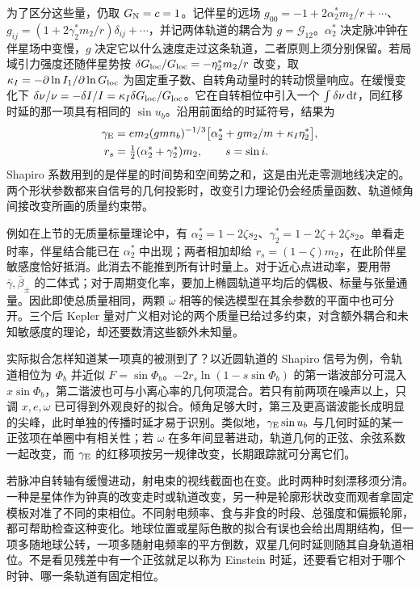 为了区分这些量，仍取 $G_{\rm N}=c=1$。记伴星的远场 $g_{00}=-1+2\alpha_2^*m_2/r+\cdots$、$g_{ij}=(1+2\gamma_2^*m_2/r)\delta_{ij}+\cdots$，并记两体轨道的耦合为 $g=\mathcal G_{12}$。$\alpha_2^*$ 决定脉冲钟在伴星场中变慢，$g$ 决定它以什么速度走过这条轨道，二者原则上须分别保留。若局域引力强度还随伴星势按 $\delta G_{\rm loc}/G_{\rm loc}=-\eta_2^*m_2/r$ 改变，取 $\kappa_I=-\partial\ln I_1/\partial\ln G_{\rm loc}$ 为固定重子数、自转角动量时的转动惯量响应。在缓慢变化下 $\delta\nu/\nu=-\delta I/I=\kappa_I\delta G_{\rm loc}/G_{\rm loc}$。它在自转相位中引入一个 $\int\delta\nu\,\dd t$，同红移时延的那一项具有相同的 $\sin u_b$。沿用前面给的时延符号，结果为
\begin{align*}
 \gamma_{\rm E}&=
  e m_2(gmn_b)^{-1/3}
       \big[\alpha_2^*+g m_2/m+\kappa_I\eta_2^*\big],\\
 r_s&=\tfrac12(\alpha_2^*+\gamma_2^*)m_2,\qquad
 s=\sin i .
\end{align*}
Shapiro 系数用到的是伴星的时间势和空间势之和，这是由光走零测地线决定的。两个形状参数都来自信号的几何投影时，改变引力理论仍会经质量函数、轨道倾角间接改变所画的质量约束带。

例如在上节的无质量标量理论中，有 $\alpha_2^*=1-2\zeta s_2$、$\gamma_2^*=1-2\zeta+2\zeta s_2$。单看走时率，伴星结合能已在 $\alpha_2^*$ 中出现；两者相加却给 $r_s=(1-\zeta)m_2$，在此阶伴星敏感度恰好抵消。此消去不能推到所有计时量上。对于近心点进动率，要用带 $\bar\gamma,\bar\beta_\pm$ 的二体式；对于周期变化率，要加上椭圆轨道平均后的偶极、标量与张量通量。因此即使总质量相同，两颗 $\dot\omega$ 相等的候选模型在其余参数的平面中也可分开。三个后 Kepler 量对广义相对论的两个质量已给过多约束，对含额外耦合和未知敏感度的理论，却还要数清这些额外未知量。

实际拟合怎样知道某一项真的被测到了？以近圆轨道的 Shapiro 信号为例，令轨道相位为 $\Phi_b$ 并近似 $F=\sin\Phi_b$。$-2r_s\ln(1-s\sin\Phi_b)$ 的第一谐波部分可混入 $x\sin\Phi_b$，第二谐波也可与小离心率的几何项混合。若只有前两项在噪声以上，只调 $x,e,\omega$ 已可得到外观良好的拟合。倾角足够大时，第三及更高谐波能长成明显的尖峰，此时单独的传播时延才易于识别。类似地，$\gamma_{\rm E}\sin u_b$ 与几何时延的某一正弦项在单圈中有相关性；若 $\omega$ 在多年间显著进动，轨道几何的正弦、余弦系数一起改变，而 $\gamma_{\rm E}$ 的红移项按另一规律改变，长期跟踪就可分离它们。

若脉冲自转轴有缓慢进动，射电束的视线截面也在变。此时两种时刻漂移须分清。一种是星体作为钟真的改变走时或轨道改变，另一种是轮廓形状改变而观者拿固定模板对准了不同的束相位。不同射电频率、食与非食的时段、总强度和偏振轮廓，都可帮助检查这种变化。地球位置或星际色散的拟合有误也会给出周期结构，但一项多随地球公转，一项多随射电频率的平方倒数，双星几何时延则随其自身轨道相位。不是看见残差中有一个正弦就足以称为 Einstein 时延，还要看它相对于哪个时钟、哪一条轨道有固定相位。


